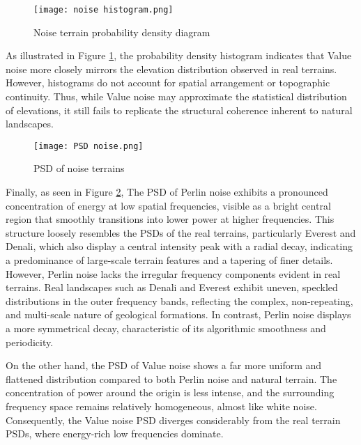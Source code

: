 \begin{figure}[H]
    \centering
    \texttt{[image: noise histogram.png]}
    \caption{Noise terrain probability density diagram}
    \label{fig:histogram_noise}
\end{figure}

As illustrated in Figure \ref{fig:histogram_noise}, the probability density histogram indicates that Value noise more closely mirrors the elevation distribution observed in real terrains. However, histograms do not account for 
spatial arrangement or topographic continuity. Thus, while Value noise may approximate the statistical distribution of elevations, it still fails to replicate the structural coherence inherent to natural 
landscapes.

\begin{figure}[H]
    \centering
    \texttt{[image: PSD noise.png]}
    \caption{PSD of noise terrains}
    \label{fig:PSD_noise}
\end{figure}

Finally, as seen in Figure \ref{fig:PSD_noise}, The PSD of Perlin noise exhibits a pronounced concentration of energy at low spatial frequencies, visible as a bright central region that smoothly transitions into lower 
power at higher frequencies. This structure loosely resembles the PSDs of the real terrains, particularly Everest and Denali, which also display a central intensity peak with a radial decay, indicating 
a predominance of large-scale terrain features and a tapering of finer details. However, Perlin noise lacks the irregular frequency components evident in real terrains. Real landscapes such as Denali and 
Everest exhibit uneven, speckled distributions in the outer frequency bands, reflecting the complex, non-repeating, and multi-scale nature of geological formations. In contrast, Perlin noise displays a 
more symmetrical decay, characteristic of its algorithmic smoothness and periodicity.

On the other hand, the PSD of Value noise shows a far more uniform and flattened distribution compared to both Perlin noise and natural terrain. The concentration of power around the origin is less intense, 
and the surrounding frequency space remains relatively homogeneous, almost like white noise. Consequently, the Value noise PSD diverges considerably from the real terrain PSDs, where energy-rich low 
frequencies dominate. 
